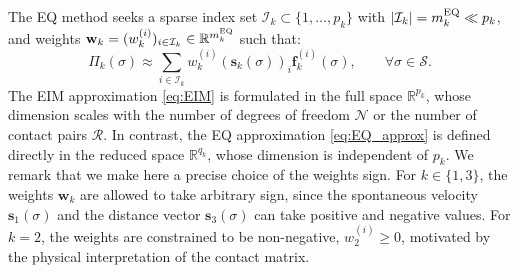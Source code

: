 The EQ method seeks a sparse index set $\mathcal{I}_k \subset \{1, \ldots, p_k\}$ with $|\mathcal{I}_k| = m_k^{\rm EQ} \ll p_k$, and weights $\mathbf{w}_k = (w_k^{(i)})_{i \in \mathcal{I}_k} \in \mathbb{R}^{m_k^{\rm EQ}}$ such that:
\begin{equation}
    \Pi_k(\sigma) \approx \sum_{i \in \mathcal{I}_k} w_k^{(i)} \left(\mathbf{s}_k(\sigma)\right)_i \mathbf{f}_k^{(i)}(\sigma), \qquad \forall \sigma \in \mathcal{S}.
    \label{eq:EQ_approx}
\end{equation}
The EIM approximation \eqref{eq:EIM} is formulated in the full space $\mathbb{R}^{p_k}$, whose dimension scales with the number of degrees of freedom $\mathcal{N}$ or the number of contact pairs $\mathcal{R}$. In contrast, the EQ approximation \eqref{eq:EQ_approx} is defined directly in the reduced space $\mathbb{R}^{q_k}$, whose dimension is independent of $p_k$. We remark that we make here a precise choice of the weights sign. For $k \in \{1, 3\}$, the weights $\mathbf{w}_k$ are allowed to take arbitrary sign, since the spontaneous velocity $\mathbf{s}_1(\sigma)$ and the distance vector $\mathbf{s}_3(\sigma)$ can take positive and negative values. For $k = 2$, the weights are constrained to be non-negative, $w_2^{(i)} \geq 0$, motivated by the physical interpretation of the contact matrix.
